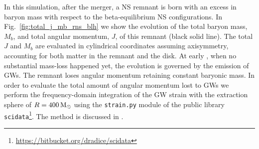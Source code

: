 In this simulation, after the merger, a \ac{NS} remnant is born with an excess 
in baryon mass with respect to the beta-equilibrium \ac{NS} configurations.
%
In Fig.~\ref{fig:total_j_mb_rns_blh} we show the evolution of the 
total baryon mass, $M_b$, and total angular momentum, $J$, of this remnant
(black solid line). 
%
The total $J$ and $M_b$ are evaluated in cylindrical coordinates assuming 
axisymmetry, accounting for both matter in the remnant and the disk. 
%
%
At early \pmerg{}, when no substantial mass-loss happened yet, the 
evolution is governed by the emission of \acp{GW}. The remnant loses 
angular momentum retaining constant baryonic mass.
%
In order to evaluate the total amount of angular momentum lost to 
\acp{GW} we perform the frequency-domain integration of the \ac{GW} 
strain with the extraction sphere of $R=400\,{\text{M}_{\odot}}$ using the 
\texttt{strain.py} module of the public library 
\texttt{scidata}\footnote{\url{https://bitbucket.org/dradice/scidata}}.
The method is discussed in 
\citet{Damour:2011fu,Bernuzzi:2012ci,Bernuzzi:2015rla}.
%

